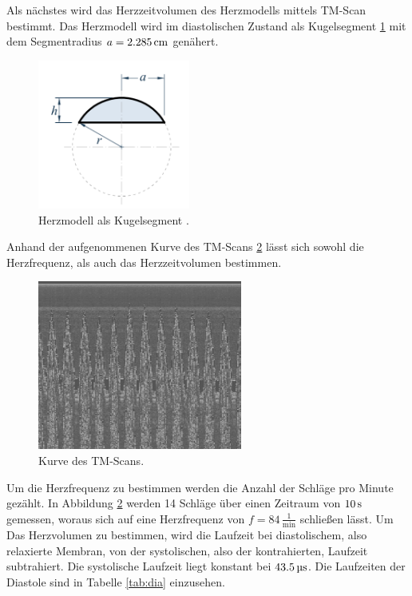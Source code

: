 Als nächstes wird das Herzzeitvolumen des Herzmodells mittels TM-Scan bestimmt.
Das Herzmodell wird im diastolischen Zustand als Kugelsegment \ref{fig:kugel}
mit dem Segmentradius $a=2.285\,\si{\centi\meter}$ genähert.
\begin{figure}[H]
  \includegraphics[width=5cm]{bilder/kugel.png}
  \caption{Herzmodell als Kugelsegment \cite{kugel}.}
  \label{fig:kugel}
\end{figure}
Anhand der aufgenommenen Kurve des TM-Scans \ref{fig:tm} lässt sich sowohl die
Herzfrequenz, als auch das Herzzeitvolumen bestimmen.
\begin{figure}[H]
  \includegraphics[width=0.6\textwidth]{bilder/TM-ScanHerz2.jpg}
  \caption{Kurve des TM-Scans.}
  \label{fig:tm}
\end{figure}
Um die Herzfrequenz zu bestimmen werden die Anzahl der Schläge pro Minute
gezählt. In Abbildung \ref{fig:tm} werden 14 Schläge über einen Zeitraum von
$10\,\si{\second}$ gemessen, woraus sich auf eine Herzfrequenz von $f = 84\,\frac{1}{\si{\minute}}$
schließen lässt.
Um Das Herzvolumen zu bestimmen, wird die Laufzeit bei diastolischem, also
relaxierte Membran, von der systolischen, also der kontrahierten, Laufzeit
subtrahiert. Die systolische Laufzeit liegt konstant bei $43.5\,\si{\micro\second}$.
 Die
Laufzeiten der Diastole sind in Tabelle \ref{tab:dia} einzusehen.
